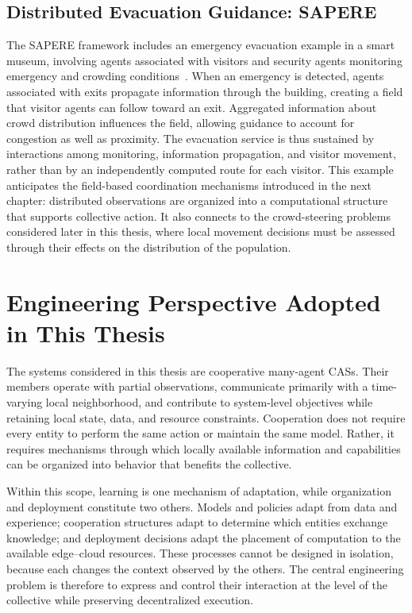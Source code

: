 \subsection{Distributed Evacuation Guidance: SAPERE}
The SAPERE framework includes an emergency evacuation example in a smart museum, 
 involving agents associated with visitors
 and security agents monitoring emergency and crowding conditions~\cite{DBLP:journals/taas/CastelliMRZ15}.
%
When an emergency is detected,
 agents associated with exits propagate information through the building,
 creating a field that visitor agents can follow toward an exit.
%
Aggregated information about crowd distribution influences the field,
 allowing guidance to account for congestion as well as proximity.
%
The evacuation service is thus sustained by interactions among monitoring, 
 information propagation, and visitor movement,
 rather than by an independently computed route for each visitor.
%
This example anticipates the field-based coordination mechanisms
 introduced in the next chapter:
 distributed observations are organized into a computational structure
 that supports collective action.
%
It also connects to the crowd-steering problems considered later in this thesis, 
 where local movement decisions must be assessed through their effects on the distribution of the population.

\section{Engineering Perspective Adopted in This Thesis}
\label{subsec:cas-thesis-perspective}

The systems considered in this thesis are cooperative many-agent \glspl{CAS}. 
%
Their members operate with partial observations, 
 communicate primarily with a time-varying local neighborhood, 
 and contribute to system-level objectives while retaining local state, data, and resource constraints. 
% 
Cooperation does not require every entity to perform the same action or maintain the same model.
%
Rather, 
 it requires mechanisms through which locally available information 
 and capabilities can be organized into behavior that benefits the collective.

Within this scope, 
 learning is one mechanism of adaptation, 
 while organization and deployment constitute two others. 
% 
Models and policies adapt from data and experience; 
 cooperation structures adapt to determine which entities exchange knowledge; 
 and deployment decisions adapt the placement of computation to the available edge--cloud resources. 
% 
These processes cannot be designed in isolation, 
 because each changes the context observed by the others. 
% 
The central engineering problem is therefore to express and control their interaction 
 at the level of the collective while preserving decentralized execution.

